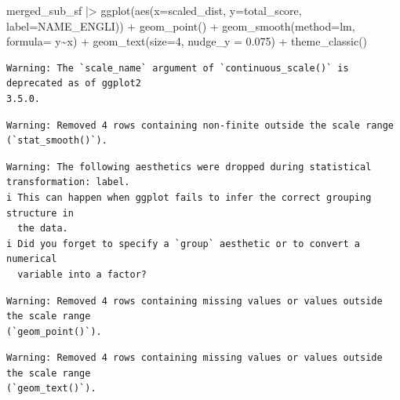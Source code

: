 \documentclass[
  letterpaper,
  DIV=11,
  numbers=noendperiod]{scrartcl}
\newenvironment{Shaded}{\begin{snugshade}}{\end{snugshade}}
\newcommand{\AttributeTok}[1]{\textcolor[rgb]{0.40,0.45,0.13}{#1}}
\newcommand{\DecValTok}[1]{\textcolor[rgb]{0.68,0.00,0.00}{#1}}
\newcommand{\FloatTok}[1]{\textcolor[rgb]{0.68,0.00,0.00}{#1}}
\newcommand{\FunctionTok}[1]{\textcolor[rgb]{0.28,0.35,0.67}{#1}}
\newcommand{\NormalTok}[1]{\textcolor[rgb]{0.00,0.23,0.31}{#1}}
\newcommand{\SpecialCharTok}[1]{\textcolor[rgb]{0.37,0.37,0.37}{#1}}
\newcommand{\StringTok}[1]{\textcolor[rgb]{0.13,0.47,0.30}{#1}}
\begin{document}
\begin{Shaded}
\begin{Highlighting}[]
\NormalTok{merged\_sub\_sf }\SpecialCharTok{|\textgreater{}} \FunctionTok{ggplot}\NormalTok{(}\FunctionTok{aes}\NormalTok{(}\AttributeTok{x=}\NormalTok{scaled\_dist, }\AttributeTok{y=}\NormalTok{total\_score, }\AttributeTok{label=}\NormalTok{NAME\_ENGLI)) }\SpecialCharTok{+}
  \FunctionTok{geom\_point}\NormalTok{() }\SpecialCharTok{+}
  \FunctionTok{geom\_smooth}\NormalTok{(}\AttributeTok{method=}\StringTok{\textquotesingle{}lm\textquotesingle{}}\NormalTok{, }\AttributeTok{formula=}\NormalTok{ y}\SpecialCharTok{\textasciitilde{}}\NormalTok{x) }\SpecialCharTok{+}
  \FunctionTok{geom\_text}\NormalTok{(}\AttributeTok{size=}\DecValTok{4}\NormalTok{, }\AttributeTok{nudge\_y =} \FloatTok{0.075}\NormalTok{) }\SpecialCharTok{+}
  \FunctionTok{theme\_classic}\NormalTok{()}
\end{Highlighting}
\end{Shaded}

\begin{verbatim}
Warning: The `scale_name` argument of `continuous_scale()` is deprecated as of ggplot2
3.5.0.
\end{verbatim}

\begin{verbatim}
Warning: Removed 4 rows containing non-finite outside the scale range
(`stat_smooth()`).
\end{verbatim}

\begin{verbatim}
Warning: The following aesthetics were dropped during statistical transformation: label.
i This can happen when ggplot fails to infer the correct grouping structure in
  the data.
i Did you forget to specify a `group` aesthetic or to convert a numerical
  variable into a factor?
\end{verbatim}

\begin{verbatim}
Warning: Removed 4 rows containing missing values or values outside the scale range
(`geom_point()`).
\end{verbatim}

\begin{verbatim}
Warning: Removed 4 rows containing missing values or values outside the scale range
(`geom_text()`).
\end{verbatim}
\end{document}
